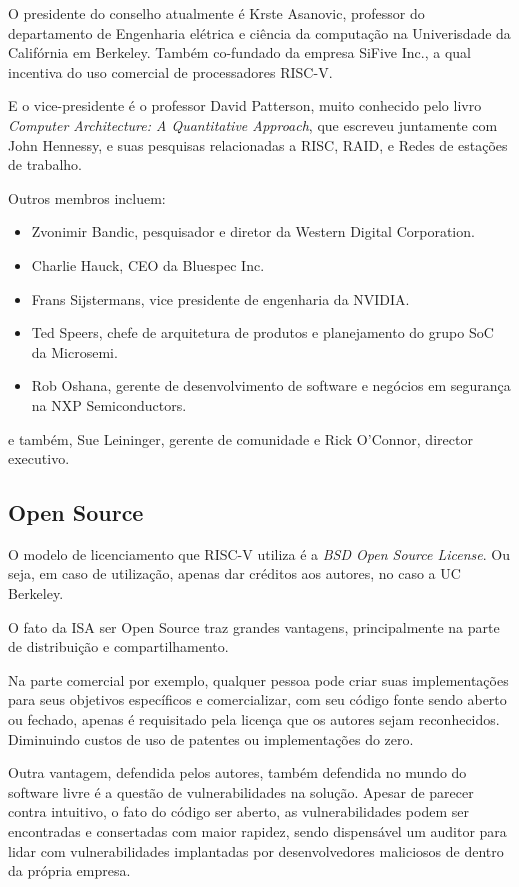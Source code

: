 		O presidente do conselho atualmente é Krste Asanovic, professor do departamento de Engenharia elétrica e ciência da computação na Univerisdade da Califórnia em Berkeley. Também co-fundado da empresa SiFive Inc., a qual incentiva do uso comercial de processadores RISC-V.\

		E o vice-presidente é o professor David Patterson, muito conhecido pelo livro \textit{Computer Architecture: A Quantitative Approach}, que escreveu juntamente com John Hennessy, e suas pesquisas relacionadas a RISC, RAID, e Redes de estações de trabalho.\

		Outros membros incluem:\
		\begin{itemize}  
			\item Zvonimir Bandic, pesquisador e diretor da Western Digital Corporation. 
			\item Charlie Hauck, CEO da Bluespec Inc.
			\item Frans Sijstermans, vice presidente de engenharia da NVIDIA.
			\item Ted Speers, chefe de arquitetura de produtos e planejamento do grupo SoC da Microsemi.
			\item Rob Oshana, gerente de desenvolvimento de software e negócios em segurança na NXP Semiconductors. 
		\end{itemize}

		e também, Sue Leininger, gerente de comunidade e Rick O’Connor, director executivo.~\cite{riscv_fboardmembers}

	\subsection{Open Source}
		
		O modelo de licenciamento que RISC-V utiliza é a \textit{BSD Open Source License}. Ou seja, em caso de utilização, apenas dar créditos aos autores, no caso a UC Berkeley.~\cite{riscv_faq}

		O fato da ISA ser Open Source traz grandes vantagens, principalmente na parte de distribuição e compartilhamento.
		
		Na parte comercial por exemplo, qualquer pessoa pode criar suas implementações para seus objetivos específicos e comercializar, com seu código fonte sendo aberto ou fechado, apenas é requisitado pela licença que os autores sejam reconhecidos. Diminuindo custos de uso de patentes ou implementações do zero.

		Outra vantagem, defendida pelos autores, também defendida no mundo do software livre é a questão de vulnerabilidades na solução. Apesar de parecer contra intuitivo, o fato do código ser aberto, as vulnerabilidades podem ser encontradas e consertadas com maior rapidez, sendo dispensável um auditor para lidar com vulnerabilidades implantadas por desenvolvedores maliciosos de dentro da própria empresa.

